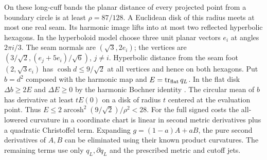 \documentclass[11pt,letterpaper]{article}
\numberwithin{equation}{section}
\begin{document}
On these long-cuff bands the planar distance of every projected point
from a boundary circle is at least \(\rho=87/128\). A Euclidean
disk of this radius meets at most one real seam. Its harmonic image
lifts into at most two reflected hyperbolic hexagons. In the
hyperboloid model choose three unit planar vectors \(e_i\) at angles
\(2\pi i/3\). The seam normals are \((\sqrt3,2e_i)\);
the vertices are \((3/\sqrt2,(e_j+5e_i)/\sqrt6)\), \(j\ne i\).
Hyperbolic distance from the seam foot \((2,\sqrt3 e_i)\) has
\(\cosh d\le9/\sqrt2\) at all vertices and hence on both hexagons.
Put \(b=d^2\) composed with the harmonic map and
\(E=\operatorname{tr}_{\rm flat}q_L\). In the flat disk
\(\Delta b\ge2E\) and \(\Delta E\ge0\) by the harmonic Bochner identity
\cite[\S3]{EellsSampson1964Harmonic}. The circular mean of \(b\) has
derivative at least \(tE(0)\) on a disk of radius \(t\) centered at
the evaluation point. Thus \(E\le2\operatorname{arcosh}^2(9/\sqrt2)/
\rho^2<28\).
For the full signed costs the all-lowered curvature in a coordinate
chart is linear in second metric derivatives plus a quadratic
Christoffel term. Expanding \(g=(1-a)A+aB\), the pure second
derivatives of \(A,B\) can be eliminated using their known product
curvatures. The remaining terms use only \(q_L,\partial q_L\) and
the prescribed metric and cutoff jets.
\end{document}
